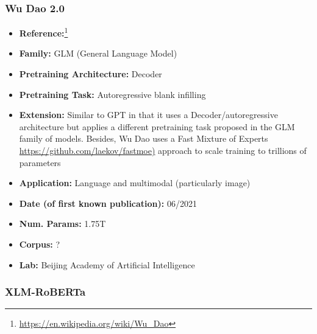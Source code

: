 \documentclass{article}
\begin{document}
\subsubsection{Wu Dao 2.0}

            \begin{itemize}
                \item \textbf{Reference:}\footnote{\url{https://en.wikipedia.org/wiki/Wu_Dao}}
                \item \textbf{Family:} GLM (General Language Model)
                \item \textbf{Pretraining Architecture:} Decoder
                \item \textbf{Pretraining Task:} Autoregressive blank infilling
                \item \textbf{Extension:} Similar to GPT in that it uses a Decoder/autoregressive architecture but applies a different pretraining task proposed in the GLM family of models. Besides, Wu Dao uses a Fast Mixture of Experts \url{https://github.com/laekov/fastmoe)} approach to scale training to trillions of parameters
                \item \textbf{Application:} Language and multimodal (particularly image)
                \item \textbf{Date (of first known publication):} 06/2021
                \item \textbf{Num. Params:} 1.75T
                \item \textbf{Corpus:} ?
                \item \textbf{Lab:} Beijing Academy of Artificial Intelligence
            \end{itemize}

\subsubsection{XLM-RoBERTa}
\end{document}
